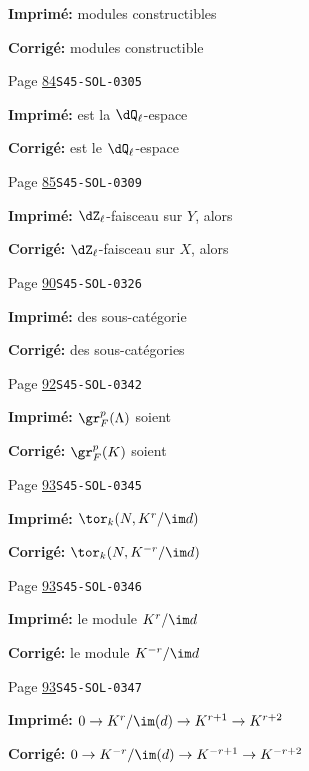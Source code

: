 \begin{description}
\par\noindent\textbf{Imprimé:} modules constructibles
\par\noindent\textbf{Corrigé:} modules constructible
\smallskip
\item[\hypertarget{apparatus:FR-0038}{38}] Page \hyperlink{printpage:fr:84}{84}\quad\texttt{S45-SOL-0305}
\par\noindent\textbf{Imprimé:} est la $\dQ_\ell$-espace
\par\noindent\textbf{Corrigé:} est le $\dQ_\ell$-espace
\smallskip
\item[\hypertarget{apparatus:FR-0039}{39}] Page \hyperlink{printpage:fr:85}{85}\quad\texttt{S45-SOL-0309}
\par\noindent\textbf{Imprimé:} $\dZ_\ell$-faisceau sur $Y$, alors
\par\noindent\textbf{Corrigé:} $\dZ_\ell$-faisceau sur $X$, alors
\smallskip
\item[\hypertarget{apparatus:FR-0040}{40}] Page \hyperlink{printpage:fr:90}{90}\quad\texttt{S45-SOL-0326}
\par\noindent\textbf{Imprimé:} des sous-catégorie
\par\noindent\textbf{Corrigé:} des sous-catégories
\smallskip
\item[\hypertarget{apparatus:FR-0041}{41}] Page \hyperlink{printpage:fr:92}{92}\quad\texttt{S45-SOL-0342}
\par\noindent\textbf{Imprimé:} $\gr_F^p(\Lambda)$ soient
\par\noindent\textbf{Corrigé:} $\gr_F^p(K)$ soient
\smallskip
\item[\hypertarget{apparatus:FR-0042}{42}] Page \hyperlink{printpage:fr:93}{93}\quad\texttt{S45-SOL-0345}
\par\noindent\textbf{Imprimé:} \(\tor_k(N,K^r/\im d)\)
\par\noindent\textbf{Corrigé:} \(\tor_k(N,K^{-r}/\im d)\)
\smallskip
\item[\hypertarget{apparatus:FR-0043}{43}] Page \hyperlink{printpage:fr:93}{93}\quad\texttt{S45-SOL-0346}
\par\noindent\textbf{Imprimé:} le module $K^r/\im d$
\par\noindent\textbf{Corrigé:} le module $K^{-r}/\im d$
\smallskip
\item[\hypertarget{apparatus:FR-0044}{44}] Page \hyperlink{printpage:fr:93}{93}\quad\texttt{S45-SOL-0347}
\par\noindent\textbf{Imprimé:} \(0 \to K^r/\im(d) \to K^{r+1} \to K^{r+2}\)
\par\noindent\textbf{Corrigé:} \(0 \to K^{-r}/\im(d) \to K^{-r+1} \to K^{-r+2}\)

\end{description}
